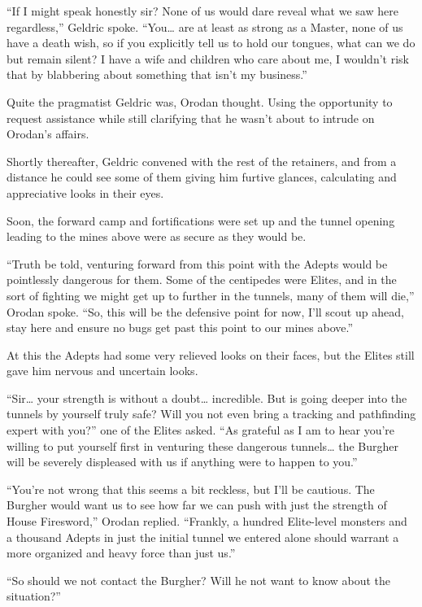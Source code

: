 \documentclass[a4paper,10pt]{book}
\begin{document}
“If I might speak honestly sir? None of us would dare reveal what we saw here regardless,” Geldric spoke. “You… are at least as strong as a Master, none of us have a death wish, so if you explicitly tell us to hold our tongues, what can we do but remain silent? I have a wife and children who care about me, I wouldn’t risk that by blabbering about something that isn’t my business.”\par
Quite the pragmatist Geldric was, Orodan thought. Using the opportunity to request assistance while still clarifying that he wasn’t about to intrude on Orodan’s affairs.\par
Shortly thereafter, Geldric convened with the rest of the retainers, and from a distance he could see some of them giving him furtive glances, calculating and appreciative looks in their eyes.\par
Soon, the forward camp and fortifications were set up and the tunnel opening leading to the mines above were as secure as they would be.\par
“Truth be told, venturing forward from this point with the Adepts would be pointlessly dangerous for them. Some of the centipedes were Elites, and in the sort of fighting we might get up to further in the tunnels, many of them will die,” Orodan spoke. “So, this will be the defensive point for now, I’ll scout up ahead, stay here and ensure no bugs get past this point to our mines above.”\par
At this the Adepts had some very relieved looks on their faces, but the Elites still gave him nervous and uncertain looks.\par
“Sir… your strength is without a doubt… incredible. But is going deeper into the tunnels by yourself truly safe? Will you not even bring a tracking and pathfinding expert with you?” one of the Elites asked. “As grateful as I am to hear you’re willing to put yourself first in venturing these dangerous tunnels… the Burgher will be severely displeased with us if anything were to happen to you.”\par
“You’re not wrong that this seems a bit reckless, but I’ll be cautious. The Burgher would want us to see how far we can push with just the strength of House Firesword,” Orodan replied. “Frankly, a hundred Elite-level monsters and a thousand Adepts in just the initial tunnel we entered alone should warrant a more organized and heavy force than just us.”\par
“So should we not contact the Burgher? Will he not want to know about the situation?”\par
\end{document}
